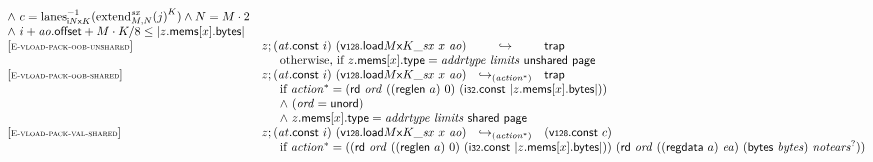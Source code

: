 $$\begin{array}[t]{@{}lrcl@{}l@{}}
{\begin{array}[t]{@{}l@{}}
{\land}~ c = {{{{\mathrm{lanes}}}_{{{\mathsf{i}}{N}}{\mathsf{x}}{K}}^{{-1}}}}{({{{{{\mathrm{extend}}}_{M, N}^{{\mathit{sx}}}}}{(j)}^{K}})} \land N = M \cdot 2 \\
{\land}~ i + {\mathit{ao}}{.}\mathsf{offset} + M \cdot K / 8 \leq {|z{.}\mathsf{mems}{}[x]{.}\mathsf{bytes}|} \\
\end{array}
} \\
{[\textsc{\scriptsize E{-}vload{-}pack{-}oob{-}unshared}]} \quad & z ; ({\mathit{at}}{.}\mathsf{const}~i)~({\mathsf{v{\scriptstyle 128}}{.}\mathsf{load}}{{M}{\mathsf{x}}{K}{\mathsf{\_}}{{\mathit{sx}}}}~x~{\mathit{ao}}) & \hookrightarrow & \mathsf{trap} &  \\
& \multicolumn{4}{@{}l@{}}{\quad
\quad \mbox{otherwise, if}~ z{.}\mathsf{mems}{}[x]{.}\mathsf{type} = {\mathit{addrtype}}~{\mathit{limits}}~\mathsf{unshared}~\mathsf{page}
} \\
{[\textsc{\scriptsize E{-}vload{-}pack{-}oob{-}shared}]} \quad & z ; ({\mathit{at}}{.}\mathsf{const}~i)~({\mathsf{v{\scriptstyle 128}}{.}\mathsf{load}}{{M}{\mathsf{x}}{K}{\mathsf{\_}}{{\mathit{sx}}}}~x~{\mathit{ao}}) & {\hookrightarrow}_{({{\mathit{action}}^\ast})} {} & \mathsf{trap} &  \\
& \multicolumn{4}{@{}l@{}}{\quad
\quad
\begin{array}[t]{@{}l@{}}
\mbox{if}~ {{\mathit{action}}^\ast} = (\mathsf{rd}~{\mathit{ord}}~((\mathsf{reglen}~a)~0)~(\mathsf{i{\scriptstyle 32}}{.}\mathsf{const}~{|z{.}\mathsf{mems}{}[x]{.}\mathsf{bytes}|})) \\
{\land}~ ({\mathit{ord}} = \mathsf{unord}) \\
{\land}~ z{.}\mathsf{mems}{}[x]{.}\mathsf{type} = {\mathit{addrtype}}~{\mathit{limits}}~\mathsf{shared}~\mathsf{page} \\
\end{array}
} \\
{[\textsc{\scriptsize E{-}vload{-}pack{-}val{-}shared}]} \quad & z ; ({\mathit{at}}{.}\mathsf{const}~i)~({\mathsf{v{\scriptstyle 128}}{.}\mathsf{load}}{{M}{\mathsf{x}}{K}{\mathsf{\_}}{{\mathit{sx}}}}~x~{\mathit{ao}}) & {\hookrightarrow}_{({{\mathit{action}}^\ast})} {} & (\mathsf{v{\scriptstyle 128}}{.}\mathsf{const}~c) &  \\
& \multicolumn{4}{@{}l@{}}{\quad
\quad
\begin{array}[t]{@{}l@{}}
\mbox{if}~ {{\mathit{action}}^\ast} = ((\mathsf{rd}~{\mathit{ord}}~((\mathsf{reglen}~a)~0)~(\mathsf{i{\scriptstyle 32}}{.}\mathsf{const}~{|z{.}\mathsf{mems}{}[x]{.}\mathsf{bytes}|}))~(\mathsf{rd}~{\mathit{ord}}~((\mathsf{regdata}~a)~{\mathit{ea}})~(\mathsf{bytes}~{\mathit{bytes}})~{{\mathit{notears}}^?})) \\

\end{array}}
\end{array}$$

